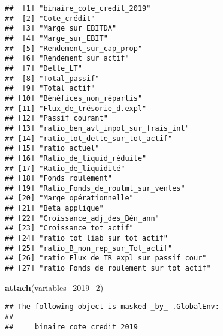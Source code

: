 \documentclass[
]{article}
\newenvironment{Shaded}{\begin{snugshade}}{\end{snugshade}}
\newcommand{\DataTypeTok}[1]{\textcolor[rgb]{0.13,0.29,0.53}{#1}}
\newcommand{\DecValTok}[1]{\textcolor[rgb]{0.00,0.00,0.81}{#1}}
\newcommand{\KeywordTok}[1]{\textcolor[rgb]{0.13,0.29,0.53}{\textbf{#1}}}
\newcommand{\NormalTok}[1]{#1}
\newcommand{\OperatorTok}[1]{\textcolor[rgb]{0.81,0.36,0.00}{\textbf{#1}}}
\newcommand{\StringTok}[1]{\textcolor[rgb]{0.31,0.60,0.02}{#1}}
\begin{document}
\begin{verbatim}
##  [1] "binaire_cote_credit_2019"              
##  [2] "Cote_crédit"                           
##  [3] "Marge_sur_EBITDA"                      
##  [4] "Marge_sur_EBIT"                        
##  [5] "Rendement_sur_cap_prop"                
##  [6] "Rendement_sur_actif"                   
##  [7] "Dette_LT"                              
##  [8] "Total_passif"                          
##  [9] "Total_actif"                           
## [10] "Bénéfices_non_répartis"                
## [11] "Flux_de_trésorie_d.expl"               
## [12] "Passif_courant"                        
## [13] "ratio_ben_avt_impot_sur_frais_int"     
## [14] "ratio_tot_dette_sur_tot_actif"         
## [15] "ratio_actuel"                          
## [16] "Ratio_de_liquid_réduite"               
## [17] "Ratio_de_liquidité"                    
## [18] "Fonds_roulement"                       
## [19] "Ratio_Fonds_de_roulmt_sur_ventes"      
## [20] "Marge_opérationnelle"                  
## [21] "Beta_applique"                         
## [22] "Croissance_adj_des_Bén_ann"            
## [23] "Croissance_tot_actif"                  
## [24] "ratio_tot_liab_sur_tot_actif"          
## [25] "ratio_B_non_rep_sur_Tot_actif"         
## [26] "ratio_Flux_de_TR_expl_sur_passif_cour" 
## [27] "ratio_Fonds_de_roulement_sur_tot_actif"
\end{verbatim}

\begin{Shaded}
\begin{Highlighting}[]
\KeywordTok{attach}\NormalTok{(variables_}\DecValTok{2019}\NormalTok{_}\DecValTok{2}\NormalTok{)}
\end{Highlighting}
\end{Shaded}

\begin{verbatim}
## The following object is masked _by_ .GlobalEnv:
## 
##     binaire_cote_credit_2019
\end{verbatim}

\begin{Shaded}
\end{Shaded}
\end{document}
